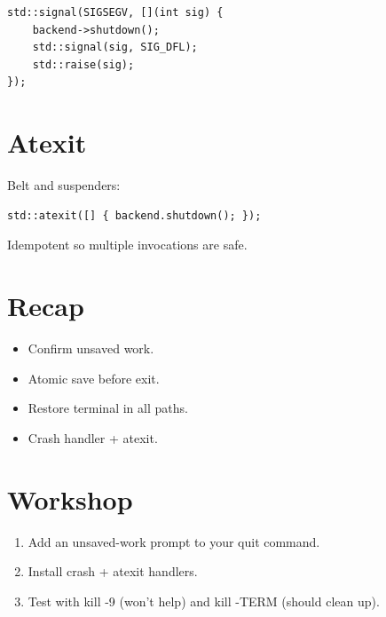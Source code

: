 \begin{lstlisting}
std::signal(SIGSEGV, [](int sig) {
    backend->shutdown();
    std::signal(sig, SIG_DFL);
    std::raise(sig);
});
\end{lstlisting}

\section{Atexit}

Belt and suspenders:

\begin{lstlisting}
std::atexit([] { backend.shutdown(); });
\end{lstlisting}

Idempotent so multiple invocations are safe.

\section{Recap}

\begin{recap}
\begin{itemize}[leftmargin=*]
  \item Confirm unsaved work.
  \item Atomic save before exit.
  \item Restore terminal in all paths.
  \item Crash handler + atexit.
\end{itemize}
\end{recap}

\section*{Workshop}

\begin{enumerate}[leftmargin=*]
  \item Add an unsaved-work prompt to your quit command.
  \item Install crash + atexit handlers.
  \item Test with kill -9 (won't help) and kill -TERM
    (should clean up).
\end{enumerate}
